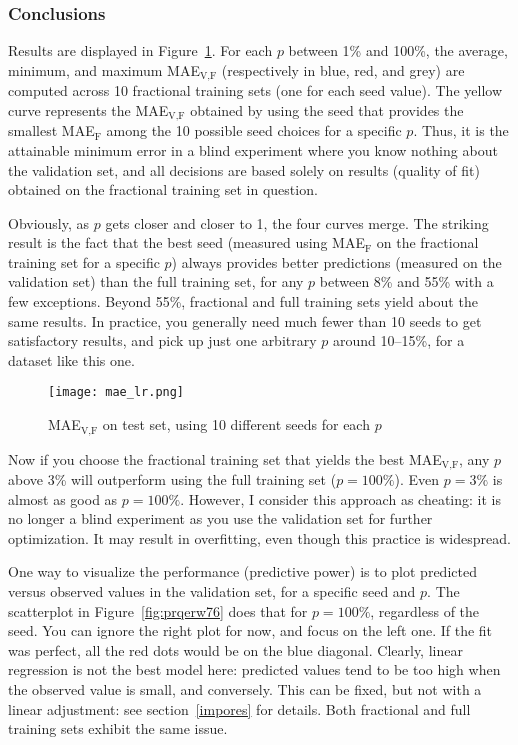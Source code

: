 \documentclass[oneside,10pt]{book}
\begin{document}
\subsubsection{Conclusions}

Results are displayed in Figure~\ref{fig:prqerw75}. For each $p$ between 1\% and 100\%, the average, minimum, and maximum   MAE$_{\text{V,F}}$ (respectively in blue, red, and grey) are
 computed across 10 fractional training sets (one for each seed value).  The yellow curve represents the MAE$_{\text{V,F}}$ obtained
 by using the seed that provides the smallest MAE$_\text{F}$ among the 10 possible seed choices for a specific $p$. Thus, it
 is the attainable minimum error in a blind experiment where you know nothing about the validation set, and all decisions are based solely
 on results (quality of fit) obtained on the fractional training set in question.

Obviously, as $p$ gets closer and closer to 1, the four curves merge. The striking  result is the fact that the best seed (measured using
  MAE$_\text{F}$ on the fractional training set for a specific $p$) always provides better predictions (measured on the validation set) than the full training set, for any $p$ between
 8\% and 55\% with a few exceptions. Beyond 55\%, fractional and full training sets yield about the same results. In practice, you
generally need much fewer than 10 seeds to get satisfactory results, and pick up just one arbitrary $p$ around 10--15\%,  for a dataset like this one.

\begin{figure}[H]
\centering
\texttt{[image: mae\_lr.png]}
\caption{MAE$_\text{V,F}$ on test set, using 10 different seeds for each $p$}
\label{fig:prqerw75}
\end{figure}

Now if you choose the fractional training set that yields the best MAE$_{\text{V,F}}$, any $p$ above 3\% will
 outperform using the full training set ($p=100\%$). Even $p=3\%$ is almost as good as $p=100\%$. However, I consider this approach as cheating: it is no longer a blind experiment as you use the validation set for further optimization. It may result in overfitting, even though this practice is widespread.

One way to visualize the performance (predictive power) is to plot predicted versus observed values in the validation set, for a specific seed and $p$. The scatterplot in Figure~\ref{fig:prqerw76} does that for $p=100\%$, regardless of the seed. You can ignore the right plot for now, and focus on the left one. If the fit was perfect, all the red dots would be on the blue diagonal. Clearly, linear regression is not the best model here: predicted values tend to be too high when the observed value is small, and conversely. This can be fixed, but not with a linear adjustment: see section~\ref{impores} for details. Both fractional and full training sets exhibit the same issue.
\end{document}
